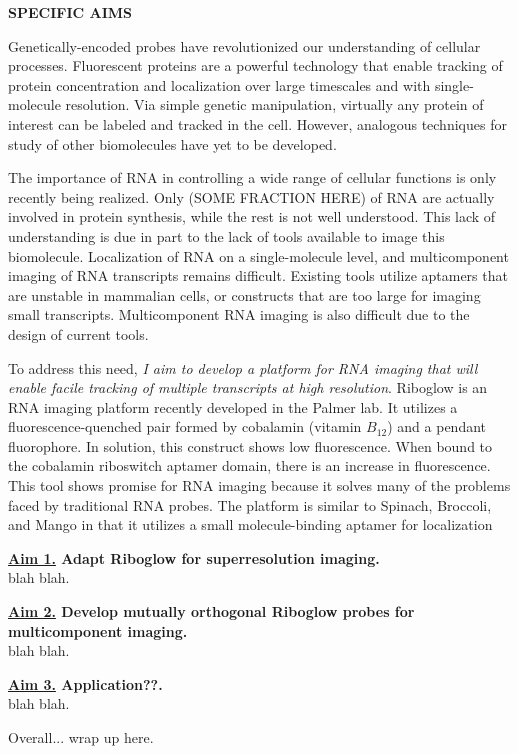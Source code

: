 \documentclass[11pt]{article}
\begin{document}



\noindent \begin{center}
{\bf SPECIFIC AIMS}
\end{center}

Genetically-encoded probes have revolutionized our understanding of cellular processes. Fluorescent proteins are a powerful technology that enable tracking of protein concentration and localization over large timescales and with single-molecule resolution. Via simple genetic manipulation, virtually any protein of interest can be labeled and tracked in the cell. However, analogous techniques for study of other biomolecules have yet to be developed.

The importance of RNA in controlling a wide range of cellular functions is only recently being realized. Only (SOME FRACTION HERE) of RNA are actually involved in protein synthesis, while the rest is not well understood. This lack of understanding is due in part to the lack of tools available to image this biomolecule. Localization of RNA on a single-molecule level, and multicomponent imaging of RNA transcripts remains difficult. Existing tools utilize aptamers that are unstable in mammalian cells, or constructs that are too large for imaging small transcripts. Multicomponent RNA imaging is also difficult due to the design of current tools.

To address this need, \textit{I aim to develop a platform for RNA imaging that will enable facile tracking of multiple transcripts at high resolution}. Riboglow is an RNA imaging platform recently developed in the Palmer lab. It utilizes a fluorescence-quenched pair formed by cobalamin (vitamin $B_12$) and a pendant fluorophore. In solution, this construct shows low fluorescence. When bound to the cobalamin riboswitch aptamer domain, there is an increase in fluorescence. This tool shows promise for RNA imaging because it solves many of the problems faced by traditional RNA probes. The platform is similar to Spinach, Broccoli, and Mango in that it utilizes a small molecule-binding aptamer for localization

{\bf \underline{Aim 1.} Adapt Riboglow for superresolution imaging.}\\
blah blah.

{\bf \underline{Aim 2.} Develop mutually orthogonal Riboglow probes for multicomponent imaging.}\\
blah blah.

{\bf \underline{Aim 3.} Application??.}\\
blah blah.

Overall... wrap up here.


\end{document}
